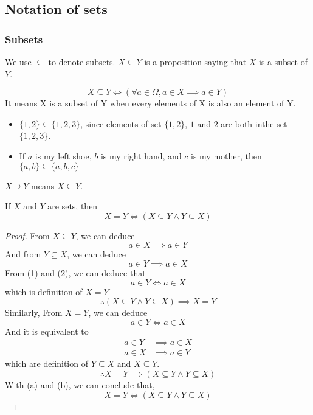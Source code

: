 \documentclass[a4paper]{article}
\begin{document}
\subsection{Notation of sets}

\subsubsection{Subsets}
\begin{notation}
We use $\subseteq$ to denote subsets. $X \subseteq Y$ is a proposition saying that $X$ is a subset of $Y$.
\end{notation}

\begin{defi}[Subset]
\[
	X \subseteq Y \iff (\forall a \in \Omega, a \in X \implies a \in Y)
\]
It means X is a subset of Y when every elements of X is also an element of Y.
\end{defi}

\begin{eg}\leavevmode
	\begin{itemize}
		\item $\{ 1, 2 \} \subseteq \{ 1, 2, 3 \}$, since elements of set $\{ 1, 2\}$, $1$ and $2$ are both inthe set $\{ 1, 2, 3 \}$.
		\item If $a$ is my left shoe, $b$ is my right hand, and $c$ is my mother, then $\{ a, b \} \subseteq \{ a, b, c \}$
	\end{itemize}
\end{eg}

\begin{notation}
$X \supseteq Y$ means $X \subseteq Y$.
\end{notation}

\begin{thm}
If $X$ and $Y$ are sets, then
\[
	X = Y \iff (X \subseteq Y \land Y \subseteq X)
\]
\end{thm}
\begin{proof}
From $X \subseteq Y$, we can deduce 
\[
	a \in X \implies a \in Y \tag{1}
\]
And from $Y \subseteq X$, we can deduce
\[
	a \in Y \implies a \in X \tag{2}
\]
From (1) and (2), we can deduce that $$a \in Y \iff a \in X$$which is definition of $X = Y$
\[
	\therefore (X \subseteq Y \land Y \subseteq X) \implies X = Y \tag{a}
\]
Similarly, From $X = Y$, we can deduce
\[
	a \in Y \iff a \in X
\]
And it is equivalent to
\begin{align*}
	a \in Y &\implies a \in X\\
	a \in X &\implies a \in Y
\end{align*}
which are definition of $Y \subseteq X$ and $X \subseteq Y$.
\[
	\therefore X = Y \implies (X \subseteq Y \land Y \subseteq X) \tag{b}
\]
With (a) and (b), we can conclude that,
\[
	X = Y \iff (X \subseteq Y \land Y \subseteq X)
\]
\end{proof}
\end{document}
